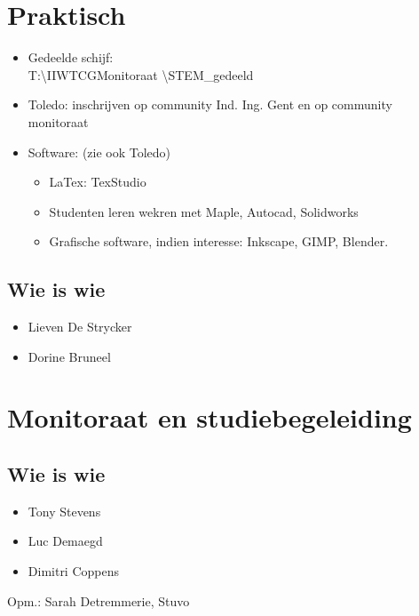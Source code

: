\section{Praktisch}

\begin{itemize}
	\item Gedeelde schijf:  \\	T:\textbackslash  IIWTCGMonitoraat \textbackslash  STEM\_gedeeld
	\item Toledo: inschrijven op community Ind. Ing. Gent en op community monitoraat
	\item Software: (zie ook Toledo)
	\begin{itemize}
		\item LaTex: TexStudio		
		\item Studenten leren wekren met Maple, Autocad, Solidworks
		\item Grafische software, indien interesse: Inkscape, GIMP, Blender.  
		\end{itemize}
\end{itemize}

\subsection*{Wie is wie}

\begin{itemize}
	\item Lieven De Strycker
	\item Dorine Bruneel
 \end{itemize}

\newpage

\section{Monitoraat en studiebegeleiding}

\subsection*{Wie is wie}

\begin{itemize}
	\item Tony Stevens
	\item Luc Demaegd
	\item Dimitri Coppens
\end{itemize}
Opm.: Sarah Detremmerie, Stuvo  
